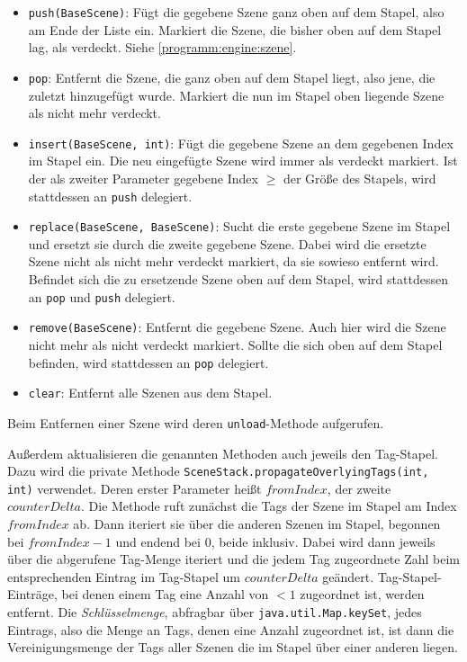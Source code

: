 \begin{sloppypar}
\begin{itemize}
	\item \texttt{push(BaseScene)}: Fügt die gegebene Szene ganz oben auf
	      dem Stapel, also am Ende der Liste ein. Markiert die Szene, die
	      bisher oben auf dem Stapel lag, als verdeckt. Siehe \ref{programm:engine:szene}.
	\item \texttt{pop}: Entfernt die Szene, die ganz oben auf dem Stapel
	      liegt, also jene, die zuletzt hinzugefügt wurde. Markiert die nun
	      im Stapel oben liegende Szene als nicht mehr verdeckt.
	\item \texttt{insert(BaseScene, int)}: Fügt die gegebene Szene an dem
	      gegebenen Index im Stapel ein. Die neu eingefügte Szene wird immer
	      als verdeckt markiert.
	      Ist der als zweiter Parameter gegebene Index $\geq$ der Größe
	      des Stapels, wird stattdessen an \texttt{push} delegiert.
	\item \texttt{replace(BaseScene, BaseScene)}: Sucht die erste gegebene
	      Szene im Stapel und ersetzt sie durch die zweite gegebene Szene.
	      Dabei wird die ersetzte Szene nicht als nicht mehr verdeckt markiert,
	      da sie sowieso entfernt wird.
	      Befindet sich die zu ersetzende Szene oben auf dem Stapel, wird
	      stattdessen an \texttt{pop} und \texttt{push} delegiert.
	\item \texttt{remove(BaseScene)}: Entfernt die gegebene Szene. Auch
	      hier wird die Szene nicht mehr als nicht verdeckt markiert.
		  Sollte die sich oben auf dem Stapel befinden, wird stattdessen an \texttt{pop}
	      delegiert.
	\item \texttt{clear}: Entfernt alle Szenen aus dem Stapel.
\end{itemize}

Beim Entfernen einer Szene wird deren \texttt{unload}-Methode aufgerufen.

Außerdem aktualisieren die genannten Methoden auch jeweils den Tag-Stapel.
Dazu wird die private Methode \texttt{SceneStack.propagateOverlyingTags(int, int)}
verwendet. Deren erster Parameter heißt $fromIndex$, der zweite
$counterDelta$. Die Methode ruft zunächst die Tags der Szene im Stapel
am Index $fromIndex$ ab. Dann iteriert sie über die anderen Szenen im Stapel,
begonnen bei $fromIndex - 1$ und endend bei $0$, beide inklusiv. Dabei
wird dann jeweils über die abgerufene Tag-Menge iteriert und die jedem
Tag zugeordnete Zahl beim entsprechenden Eintrag im Tag-Stapel um
$counterDelta$ geändert. Tag-Stapel-Einträge, bei denen einem Tag
eine Anzahl von $< 1$ zugeordnet ist, werden entfernt. Die \textit{Schlüsselmenge},
abfragbar über \texttt{java.util.Map.keySet}, jedes Eintrags, also
die Menge an Tags, denen eine Anzahl zugeordnet ist, ist dann die
Vereinigungsmenge der Tags aller Szenen die im Stapel über einer
anderen liegen.


\end{sloppypar}
